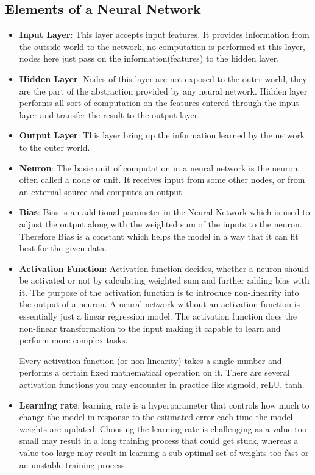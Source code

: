 \subsection{Elements of a Neural Network }
 
  \begin{itemize}
      \item \textbf{Input Layer}: This layer accepts input features. It provides information from the outside world to the network, no computation is performed at this layer, nodes here just pass on the information(features) to the hidden layer.
      \item \textbf{Hidden Layer}: Nodes of this layer are not exposed to the outer world, they are the part of the abstraction provided by any neural network. Hidden layer performs all sort of computation on the features entered through the input layer and transfer the result to the output layer.
      \item \textbf{Output Layer}: This layer bring up the information learned by the network to the outer world.
      \item  \textbf{Neuron}: The basic unit of computation in a neural network is the neuron, often called a node or unit. It receives input from some other nodes, or from an external source and computes an output.
      \item \textbf{Bias}: Bias is an additional parameter in the Neural Network which is used to adjust the output along with the weighted sum of the inputs to the neuron. Therefore Bias is a constant which helps the model in a way that it can fit best for the given data.
      \item \textbf{Activation Function}: Activation function decides, whether a neuron should be activated or not by calculating weighted sum and further adding bias with it. The purpose of the activation function is to introduce non-linearity into the output of a neuron. A neural network without an activation function is essentially just a linear regression model. The activation function does the non-linear transformation to the input making it capable to learn and perform more complex tasks. \par
         Every activation function (or non-linearity) takes a single number and performs a certain fixed mathematical operation on it. There are several activation functions you may encounter in practice like sigmoid, reLU, tanh.
      \item \textbf{Learning rate}: learning rate is a hyperparameter that controls how much to change the model in response to the estimated error each time the model weights are updated. Choosing the learning rate is challenging as a value too small may result in a long training process that could get stuck, whereas a value too large may result in learning a sub-optimal set of weights too fast or an unstable training process.
   
      \end{itemize}
      
